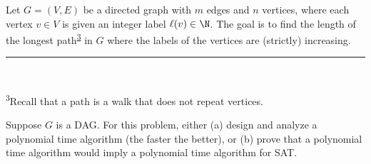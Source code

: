\documentclass{article}
\begin{document}
\setcounter{section}{12}
\setcounter{exercise}{10}

 Let \( G = (V, E) \) be a directed graph with \( m \) edges and \( n \) vertices, where each vertex \( v \in V \) is given an integer label \( \ell(v) \in\N \).
The goal is to find the length of the longest path\textsuperscript{\hyperref[fn:path]{3}} in \( G \) where the labels of the vertices are (strictly) increasing.\\
\noindent\rule{2in}{0.4pt} \\
\parbox{\linewidth}{\small \textsuperscript{\label{fn:path}3}Recall that a path is a walk that does not repeat vertices.}

\begin{subexercise}
  Suppose \( G \) is a DAG. For this problem, either (a) design and analyze a polynomial time algorithm (the faster the better), or (b) prove that a polynomial time algorithm would imply a polynomial time algorithm for SAT.
\end{subexercise}
\end{document}

